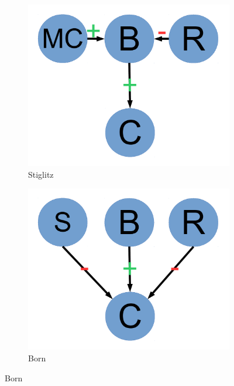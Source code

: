 \documentclass[11pt]{article}
\begin{document}
\begin{figure}
\begin{subfigure}[b]{0.2\textwidth}
                \label{fig:becker}
        \end{subfigure}
        \begin{subfigure}[b]{0.2\textwidth}
                \includegraphics[width=\textwidth]{stiglitz.pdf}
                \caption{\footnotesize Stiglitz}
                \label{fig:stiglitz}
        \end{subfigure}
        \begin{subfigure}[b]{0.2\textwidth}
                \includegraphics[width=\textwidth]{born.pdf}
                \caption{\footnotesize Born}
                \label{fig:born}
        \end{subfigure}

\end{figure}
\end{document}
